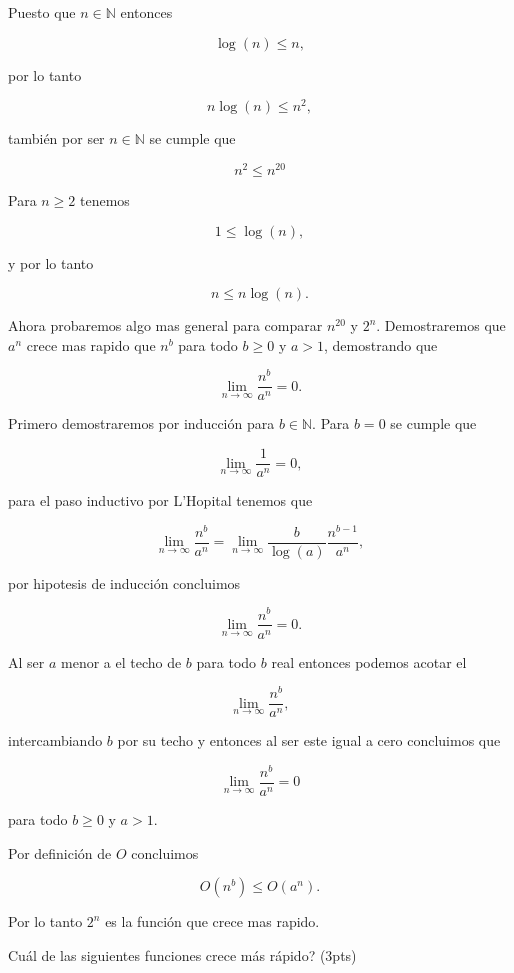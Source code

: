 \documentclass[answers,11pt]{exam}
\begin{document}
\begin{questions}
Puesto que $n \in \mathbb{N}$ entonces

\[\log(n) \leq n,\]

por lo tanto

\[n\log(n) \leq n^2,\]

también por ser $n \in \mathbb{N}$ se cumple que

\[n^2 \leq n^20\]

Para $n \geq 2$ tenemos

\[1 \leq \log(n),\]

y por lo tanto

\[n \leq n\log(n).\]

Ahora probaremos algo mas general para comparar $n^{20}$ y $2^n$. Demostraremos que $a^n$ crece mas rapido que $n^b$ para todo $b\geq 0$ y $a>1$, demostrando que

\[\lim_{n\to\infty} \frac{n^b}{a^n} = 0.\]

Primero demostraremos por inducción para $b \in \mathbb{N}$. Para $b = 0$ se cumple que

\[\lim_{n\to\infty} \frac{1}{a^n} = 0,\]

para el paso inductivo por L'Hopital tenemos que

\[\lim_{n\to\infty} \frac{n^b}{a^n} = \lim_{n\to\infty} \frac{b}{\log(a)}\frac{n^{b-1}}{a^n},\]

por hipotesis de inducción concluimos

\[\lim_{n\to\infty} \frac{n^b}{a^n} = 0.\]

Al ser $a$ menor a el techo de $b$ para todo $b$ real entonces podemos acotar el 

\[\lim_{n\to\infty} \frac{n^b}{a^n},\]

intercambiando $b$ por su techo y entonces al ser este igual a cero concluimos que

\[\lim_{n\to\infty} \frac{n^b}{a^n} = 0\]

para todo $b\geq0$ y $a>1$.

Por definición de $O$ concluimos

\[O(n^b)\leq O(a^n).\]

Por lo tanto $2^n$ es la función que crece mas rapido.

\question
\textquestiondown Cu\'al de las siguientes funciones crece m\'as r\'apido? (3pts)

\begin{oneparchoices}
\end{oneparchoices}


\end{questions}
\end{document}
